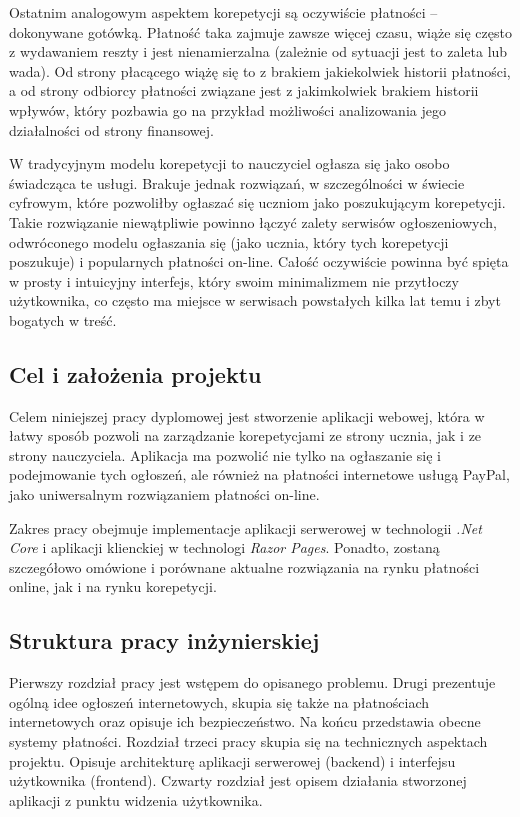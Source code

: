 \documentclass[12pt]{article}
\numberwithin{figure}{section}
\begin{document}
\begin{sloppypar}
Ostatnim analogowym aspektem korepetycji są oczywiście płatności -- dokonywane gotówką. Płatność taka zajmuje zawsze więcej czasu, wiąże się często z wydawaniem reszty i jest nienamierzalna (zależnie od sytuacji jest to zaleta lub wada). Od strony płacącego wiążę się to z brakiem jakiekolwiek historii płatności, a od strony odbiorcy płatności związane jest z jakimkolwiek brakiem historii wpływów, który pozbawia go na przykład możliwości analizowania jego działalności od strony finansowej. 

W tradycyjnym modelu korepetycji to nauczyciel ogłasza się jako osobo świadcząca te usługi. Brakuje jednak rozwiązań, w szczególności w świecie cyfrowym, które pozwoliłby ogłaszać się uczniom jako poszukującym korepetycji. Takie rozwiązanie niewątpliwie powinno łączyć zalety serwisów ogłoszeniowych, odwróconego modelu ogłaszania się (jako ucznia, który tych korepetycji poszukuje) i popularnych płatności on-line. Całość oczywiście powinna być spięta w prosty i intuicyjny interfejs, który swoim minimalizmem nie przytłoczy użytkownika, co często ma miejsce w serwisach powstałych kilka lat temu i zbyt bogatych w treść.
\subsection{Cel i założenia projektu}
Celem niniejszej pracy dyplomowej jest stworzenie aplikacji webowej, która w łatwy sposób pozwoli na zarządzanie korepetycjami ze strony ucznia, jak i ze strony nauczyciela. Aplikacja ma pozwolić nie tylko na ogłaszanie się i podejmowanie tych ogłoszeń, ale również na płatności internetowe usługą PayPal, jako uniwersalnym rozwiązaniem płatności on-line. 

Zakres pracy obejmuje implementacje aplikacji serwerowej w technologii \textit{.Net Core} i aplikacji klienckiej w technologi \textit{Razor Pages}. Ponadto, zostaną szczegółowo omówione i porównane aktualne rozwiązania na rynku płatności online, jak i na rynku korepetycji.

\subsection{Struktura pracy inżynierskiej}
Pierwszy rozdział pracy jest wstępem do opisanego problemu. Drugi prezentuje ogólną idee ogłoszeń internetowych, skupia się także na płatnościach internetowych oraz opisuje ich bezpieczeństwo. Na końcu przedstawia obecne systemy płatności. Rozdział trzeci pracy skupia się na technicznych aspektach projektu. Opisuje architekturę aplikacji serwerowej (backend) i interfejsu użytkownika (frontend). Czwarty rozdział jest opisem działania stworzonej aplikacji z punktu widzenia użytkownika. 


\end{sloppypar}
\end{document}
